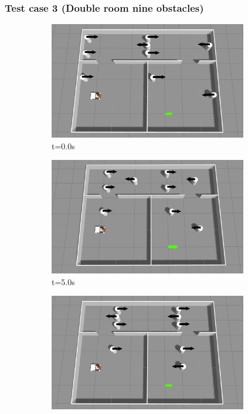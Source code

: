 \documentclass{beamer}
\begin{document}
\begin{frame}
    \frametitle{\huge{Test case 3} (Double room nine obstacles)}
    \begin{figure}[H]
        \centering
        \begin{subfigure}[b]{0.35\linewidth}
            \centering
            \includegraphics[width=0.95\textwidth]{../report/images/test_case_3/exp1.png}
            \caption{t=0.0s}
        \end{subfigure}%
        \begin{subfigure}[b]{0.35\linewidth}
            \centering
            \includegraphics[width=0.95\textwidth]{../report/images/test_case_3/mid1.png}
            \caption{t=5.0s}
        \end{subfigure}%
        \begin{subfigure}[b]{0.35\linewidth}
            \centering
            \includegraphics[width=0.95\textwidth]{../report/images/test_case_3/exp2.png}

\end{subfigure}
\end{figure}
\end{frame}
\end{document}
